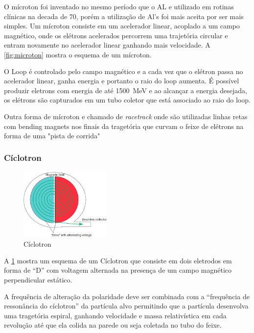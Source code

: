 \documentclass[11pt,a4paper]{article}
\begin{document}
                O mícroton foi inventado no mesmo período que o AL e utilizado em rotinas clínicas na decada de 70, porém a utilização de Al's foi mais aceita por ser mais simples. Um mícroton consiste em um acelerador linear, acoplado a um campo magnético,  onde os elétrons acelerados percorrem uma trajetória circular e entram novamente no acelerador linear ganhando mais velocidade. A \ref{fig:microton} mostra o esquema de um mícroton. 
                
                O Loop é controlado pelo campo magnético e a cada vez que o elétron passa no acelerador linear,  ganha energia e portanto o raio do loop aumenta.  É possível produzir eletrons com energia de até \qty{1500}{MeV} e ao alcançar a energia desejada, os elétrons são capturados em um tubo coletor que está associado ao raio do loop.


                Outra forma de mícroton e chamado de \textit{racetrack} onde são utilizadas linhas retas com bending magnets nos finais da tragetória que curvam o feixe de elétrons na forma de uma "pista de corrida"
                


            \subsubsection{Cíclotron}


            \begin{figure}
                \centering
                \includegraphics[width=0.4\textwidth]{Imagens/ciclotron.jpg}
                \caption{Cíclotron}
                \label{fig:ciclotron}
            \end{figure}


                A \ref{fig:ciclotron} mostra um esquema de um Cíclotron que consiste em dois eletrodos em forma de ``D'' com voltagem alternada na presença de um campo magnético perpendicular estático.

                A frequência de alteração da polaridade deve ser combinada com a ``frequência de ressonância do cíclotron'' da partícula alvo permitindo que a partícula desenvolva uma tragetória espiral, ganhando velocidade e massa relativística em cada revolução até que ela colida na parede ou seja coletada no tubo do feixe. 
\end{document}
